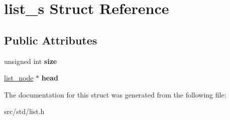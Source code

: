 \hypertarget{structlist__s}{}\section{list\+\_\+s Struct Reference}
\label{structlist__s}
\subsection*{Public Attributes}
\begin{DoxyCompactItemize}
\item 
\mbox{\label{structlist__s_ae22634607fa636cd4130bfee49249785}} 
unsigned int {\bfseries size}
\item 
\mbox{\label{structlist__s_ac0cbf2cf20ad6060fb10219b91703773}} 
\hyperlink{structlist__node__s}{list\+\_\+node} $\ast$ {\bfseries head}
\end{DoxyCompactItemize}


The documentation for this struct was generated from the following file\+:\begin{DoxyCompactItemize}
\item 
src/std/list.\+h\end{DoxyCompactItemize}
